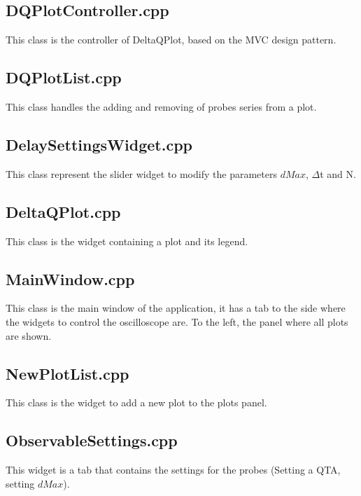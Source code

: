 \subsection{DQPlotController.cpp}
This class is the controller of DeltaQPlot, based on the MVC design pattern.


\subsection{DQPlotList.cpp}
This class handles the adding and removing of probes series from a plot.


\subsection{DelaySettingsWidget.cpp}
This class represent the slider widget to modify the parameters $dMax$, $\Delta$t and N.


\subsection{DeltaQPlot.cpp}
This class is the widget containing a plot and its legend.


\subsection{MainWindow.cpp}
This class is the main window of the application, it has a tab to the side where the widgets to control the oscilloscope are. To the left, the panel where all plots are shown.


\subsection{NewPlotList.cpp}
This class is the widget to add a new plot to the plots panel.


\subsection{ObservableSettings.cpp}
This widget is a tab that contains the settings for the probes (Setting a QTA, setting $dMax$).


